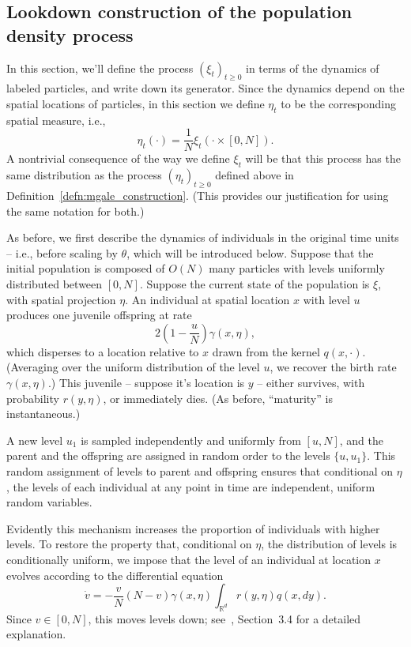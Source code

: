 \documentclass[12pt]{article}
\newcommand{\IR}{\mathbb R}
\newcommand{\lp}{\xi}              %
\begin{document}
\subsection{Lookdown construction of the population density process}
\label{sec:lookdown_defn}

In this section,
we'll define the process $(\lp_t)_{t \ge 0}$ in terms of the dynamics of labeled particles,
and write down its generator.
Since the dynamics depend on the spatial locations of particles,
in this section we define $\eta_t$ to be the corresponding spatial measure,
i.e.,
$$
    \eta_t(\cdot) = \frac{1}{N} \lp_t(\cdot \times [0, N])  .
$$
A nontrivial consequence of the way we define $\lp_t$ will be that
this process has the same distribution as the process $(\eta_t)_{t \ge 0}$ defined above
in Definition~\ref{defn:mgale_construction}.
(This provides our justification for using the same notation for both.)

As before, we first describe the dynamics of individuals
in the original time units -- i.e., before scaling by $\theta$,
which will be introduced below.
Suppose that the initial population is composed of $O(N)$ many particles
with levels uniformly distributed between $[0, N]$.
Suppose the current state of the population is $\lp$,
with spatial projection $\eta$.
An individual at spatial location $x$ with level $u$
produces one juvenile offspring at rate 
$$
2 \left(1 - \frac{u}{N}\right) \gamma(x, \eta) ,
$$
which disperses to a location relative to $x$ drawn from the kernel $q(x, \cdot)$.
(Averaging over the uniform distribution of the level $u$,
we recover the birth rate $\gamma(x, \eta)$.)
This juvenile -- suppose it's location is $y$ --
either survives, with probability $r(y, \eta)$, or immediately dies.
(As before, ``maturity'' is instantaneous.)

A new level $u_1$ is sampled independently and uniformly from $[u,N]$,
and the parent and the offspring are assigned in random order to the levels $\{u, u_1\}$.
This random assignment of levels to parent
and offspring ensures that conditional on $\eta$,
the levels of each individual at any point in time are independent, uniform random variables.

Evidently this mechanism increases the proportion
of individuals with higher levels.
To restore the property that,
conditional on $\eta$,
the distribution of levels is conditionally uniform,
we impose that 
the level of an individual at location $x$
evolves according to the differential equation
$$
    \dot{v}
    =
    - \frac{v}{N} \left(N - v\right)
    \gamma(x, \eta) \int_{\IR^d} r(y, \eta) q(x, dy) .
$$
Since $v \in [0, N]$, this moves levels down;
see~\cite{etheridge/kurtz:2018}, Section~3.4 for a detailed explanation.
\end{document}
